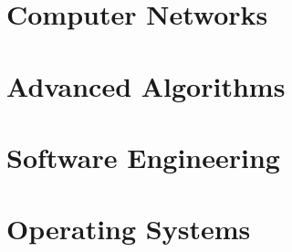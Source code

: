 \part{Computer Networks}


\part{Advanced Algorithms}


\part{Software Engineering}


\part{Operating Systems}


